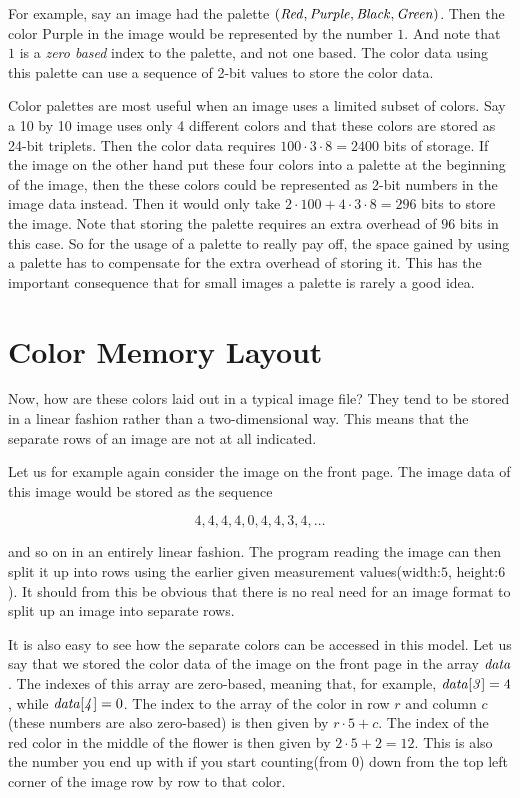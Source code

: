 For example, say an image had the palette $(\mathit{Red}, \mathit{Purple}, \mathit{Black},
\mathit{Green})$. Then the color Purple in the image would be represented by
the number $1$. And note that $1$ is a \textit{zero based} index to
the palette, and not one based. The color data using this palette can
use a sequence of 2-bit values to store the color data.

Color palettes are most useful when an image uses a limited subset of
colors. Say a 10 by 10 image uses only 4 different colors and that
these colors are stored as 24-bit triplets. Then the color data
requires $100 \cdot 3 \cdot 8 = 2400$ bits of storage. If the image on
the other hand put these four colors into a palette at the beginning
of the image, then the these colors could be represented as 2-bit
numbers in the image data instead. Then it would only take $2 \cdot
100 + 4 \cdot 3 \cdot 8 = 296$ bits to store the image. Note that
storing the palette requires an extra overhead of $96$ bits in this
case. So for the usage of a palette to really pay off, the space
gained by using a palette has to compensate for the extra overhead of
storing it. This has the important consequence that for small images a
palette is rarely a good idea.

\section{Color Memory Layout}
\label{sec:color-layout}

Now, how are these colors laid out in a typical image file? They tend
to be stored in a linear fashion rather than a two-dimensional
way. This means that the separate rows of an image are not at all
indicated.

Let us for example again consider the image on the front page. The
image data of this image would be stored as the sequence

\begin{equation*}
  4,4,4,4,0,4,4,3,4,\dots
\end{equation*}

and so on in an entirely linear fashion. The program reading the image
can then split it up into rows using the earlier given measurement
values(width:$5$, height:$6$). It should from this be obvious that
there is no real need for an image format to split up an image into
separate rows.

It is also easy to see how the separate colors can be accessed in this
model. Let us say that we stored the color data of the image on the
front page in the array $\mathit{data}$. The indexes of this array are
zero-based, meaning that, for example, $\mathit{data[3]}=4$, while
$\mathit{data[4]}=0$. The index to the array of the color in row $r$ and column
$c$(these numbers are also zero-based) is then given by $r \cdot 5 +
c$. The index of the red color in the middle of the flower is then
given by $2 \cdot 5 + 2 = 12$. This is also the number you end up with
if you start counting(from $0$) down from the top left corner of the
image row by row to that color.

